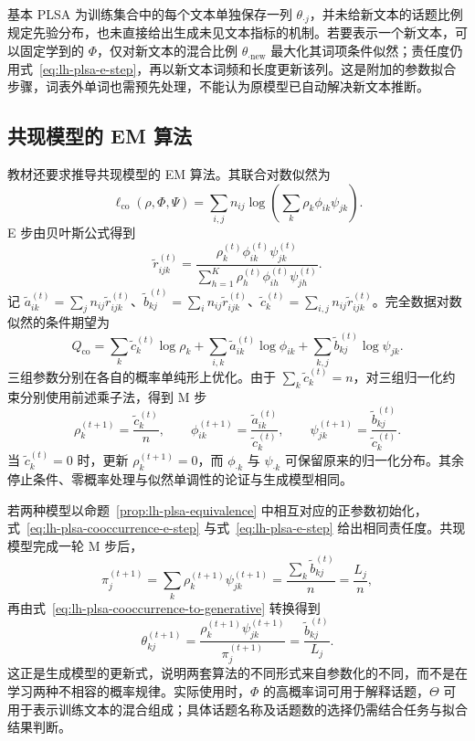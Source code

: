 \begin{notealert}[type=caution,title={文本指标与新文本}]
基本 PLSA 为训练集合中的每个文本单独保存一列 $\theta_{\cdot j}$，并未给新文本的话题比例规定先验分布，也未直接给出生成未见文本指标的机制。若要表示一个新文本，可以固定学到的 $\Phi$，仅对新文本的混合比例 $\theta_{\cdot\mathrm{new}}$ 最大化其词项条件似然；责任度仍用式~\eqref{eq:lh-plsa-e-step}，再以新文本词频和长度更新该列。这是附加的参数拟合步骤，词表外单词也需预先处理，不能认为原模型已自动解决新文本推断。
\end{notealert}

\subsection{共现模型的 EM 算法}
\label{subsec:lh-plsa-cooccurrence-em}

教材还要求推导共现模型的 EM 算法。其联合对数似然为
\[
\ell_{\mathrm{co}}(\rho,\Phi,\Psi)
=\sum_{i,j}n_{ij}\log\left(\sum_k\rho_k\phi_{ik}\psi_{jk}\right).
\]
E 步由贝叶斯公式得到
\begin{equation}
\widetilde r_{ijk}^{(t)}=
\frac{\rho_k^{(t)}\phi_{ik}^{(t)}\psi_{jk}^{(t)}}
{\sum_{h=1}^K\rho_h^{(t)}\phi_{ih}^{(t)}\psi_{jh}^{(t)}}.
\label{eq:lh-plsa-cooccurrence-e-step}
\end{equation}
记 $\widetilde a_{ik}^{(t)}=\sum_jn_{ij}\widetilde r_{ijk}^{(t)}$、$\widetilde b_{kj}^{(t)}=\sum_in_{ij}\widetilde r_{ijk}^{(t)}$、$\widetilde c_k^{(t)}=\sum_{i,j}n_{ij}\widetilde r_{ijk}^{(t)}$。完全数据对数似然的条件期望为
\[
Q_{\mathrm{co}}=\sum_k\widetilde c_k^{(t)}\log\rho_k
+\sum_{i,k}\widetilde a_{ik}^{(t)}\log\phi_{ik}
+\sum_{k,j}\widetilde b_{kj}^{(t)}\log\psi_{jk}.
\]
三组参数分别在各自的概率单纯形上优化。由于 $\sum_k\widetilde c_k^{(t)}=n$，对三组归一化约束分别使用前述乘子法，得到 M 步
\begin{equation}
\rho_k^{(t+1)}=\frac{\widetilde c_k^{(t)}}{n},\qquad
\phi_{ik}^{(t+1)}=\frac{\widetilde a_{ik}^{(t)}}{\widetilde c_k^{(t)}},\qquad
\psi_{jk}^{(t+1)}=\frac{\widetilde b_{kj}^{(t)}}{\widetilde c_k^{(t)}}.
\label{eq:lh-plsa-cooccurrence-m-step}
\end{equation}
当 $\widetilde c_k^{(t)}=0$ 时，更新 $\rho_k^{(t+1)}=0$，而 $\phi_{\cdot k}$ 与 $\psi_{\cdot k}$ 可保留原来的归一化分布。其余停止条件、零概率处理与似然单调性的论证与生成模型相同。

若两种模型以命题~\ref{prop:lh-plsa-equivalence} 中相互对应的正参数初始化，式~\eqref{eq:lh-plsa-cooccurrence-e-step} 与式~\eqref{eq:lh-plsa-e-step} 给出相同责任度。共现模型完成一轮 M 步后，
\[
\pi_j^{(t+1)}=\sum_k\rho_k^{(t+1)}\psi_{jk}^{(t+1)}
=\frac{\sum_k\widetilde b_{kj}^{(t)}}{n}=\frac{L_j}{n},
\]
再由式~\eqref{eq:lh-plsa-cooccurrence-to-generative} 转换得到
\[
\theta_{kj}^{(t+1)}=
\frac{\rho_k^{(t+1)}\psi_{jk}^{(t+1)}}{\pi_j^{(t+1)}}
=\frac{\widetilde b_{kj}^{(t)}}{L_j}.
\]
这正是生成模型的更新式，说明两套算法的不同形式来自参数化的不同，而不是在学习两种不相容的概率规律。实际使用时，$\Phi$ 的高概率词可用于解释话题，$\Theta$ 可用于表示训练文本的混合组成；具体话题名称及话题数的选择仍需结合任务与拟合结果判断。






